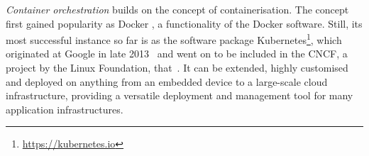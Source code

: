 \emph{Container orchestration} builds on the concept of containerisation.  The concept first gained popularity as Docker , a functionality of the Docker software. Still, its most successful instance so far is as the software package Kubernetes\footnote{\url{https://kubernetes.io}}, which originated at Google in late 2013~\parencite{kubernetesHistory} and went on to be included in the \ac{CNCF}, a project by the Linux Foundation, that~.
It can be extended, highly customised and deployed on anything from an embedded device to a large-scale cloud infrastructure, providing a versatile deployment and management tool for many application infrastructures.
